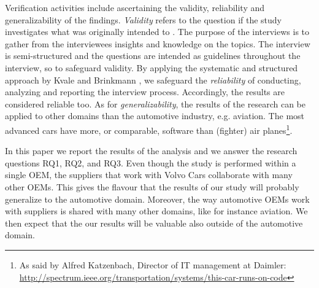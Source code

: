  Verification activities include ascertaining the validity, reliability and generalizability of the findings. {\em Validity} refers to the question if the study investigates what was originally intended to \cite{Kvale2015Interviews}. The purpose of the interviews is to gather from the interviewees insights and knowledge on the topics. The interview is semi-structured and the questions are intended as guidelines throughout the interview, so to safeguard validity. %
By applying the systematic and structured approach by Kvale and Brinkmann \cite{Kvale2015Interviews}, we safeguard the {\em reliability} of conducting, analyzing and reporting  the interview process. Accordingly, the results are considered reliable too. As for {\em generalizability}, the results of the research can be applied to other domains than the automotive industry, e.g. aviation. The most advanced cars have more, or comparable, software than (fighter) air planes\footnote{As said by Alfred Katzenbach, Director of IT management at Daimler: \url{http://spectrum.ieee.org/transportation/systems/this-car-runs-on-code}}.%

 In this paper we report the results of the analysis and we answer the research questions RQ1, RQ2, and RQ3. 
Even though the study is performed within a single OEM, the suppliers that work with Volvo Cars collaborate with many other OEMs. This gives the flavour that the results of our study will probably generalize to the automotive domain. Moreover, the way automotive OEMs work with suppliers is shared with many other domains, like for instance aviation. We then expect that the our results will be valuable also outside of the automotive domain.


